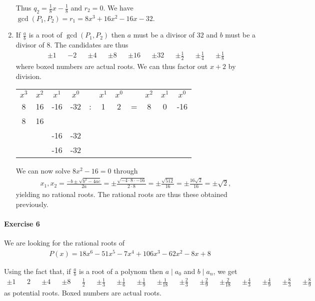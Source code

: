 \documentclass{article}
\begin{document}
\begin{enumerate}
    Thus $q_2 = \frac{1}{8}x - \frac{1}{8}$ and $r_2 = 0$. We have $\gcd(P_1, P_2) = r_1 = 8x^3 + 16x^2 - 16x - 32$.

    \item If $\frac{a}{b}$ is a root of $\gcd(P_1, P_2)$ then $a$ must be a divisor of $32$ and $b$ must be a divisor of $8$. The candidates are thus 
    \begin{align*}
        \pm1&&\boxed{-2}&&\pm4&&\pm8&&\pm16&&\pm32&&\pm\frac{1}{2}&&\pm\frac{1}{4}&&\pm\frac{1}{8}
    \end{align*}
    where boxed numbers are actual roots. We can thus factor out $x + 2$ by division.

    \begin{center}
        \begin{tabular}{cccc c cc c ccc}
            $x^3$&$x^2$&$x^1$&$x^0$&&$x^1$&$x^0$&&$x^2$&$x^1$&$x^0$ \\
            8&16&-16&-32&:&1&2&=&8&0&-16\\
            8&16\\\cmidrule{1-2}
            &&-16&-32\\
            &&-16&-32\\\cmidrule{3-4}
        \end{tabular}
    \end{center}

    We can now solve $8x^2 - 16 = 0$ through
    \begin{align*}
        x_1,x_2 = \frac{-b \pm \sqrt{b^2 - 4ac}}{2a} =
        \pm\frac{\sqrt{-4 \cdot 8 \cdot -16}}{2 \cdot 8} =
        \pm\frac{\sqrt{512}}{16} =
        \pm\frac{16\sqrt{2}}{16} = \pm \sqrt{2},
    \end{align*}
    yielding no rational roots. The rational roots are thus these obtained previously.
\end{enumerate}

\pagebreak
\paragraph{Exercise 6}

We are looking for the rational roots of
\begin{align*}
    P(x) = 18 x^6 - 51 x^5 - 7 x^4 + 106 x^3 - 62 x^2 - 8 x + 8
\end{align*}

Using the fact that, if $\frac{a}{b}$ is a root of a polynom then $a \mid a_0$ and $b \mid a_n$, we get
\begin{align*}
    \pm1&&\boxed{2}&&\pm4&&\pm8&&\boxed{\frac{1}{2}}&&\pm\frac{1}{3}&&\pm\frac{1}{6}&&\pm\frac{1}{9}&&\pm\frac{1}{18}&&\boxed{\pm\frac{2}{3}}&&\pm\frac{2}{9}&&\pm\frac{2}{18}&&\pm\frac{4}{3}&&\pm\frac{4}{9}&&\pm\frac{8}{3}&&\pm\frac{8}{9}
\end{align*}
as potential roots. Boxed numbers are actual roots.
\end{document}
